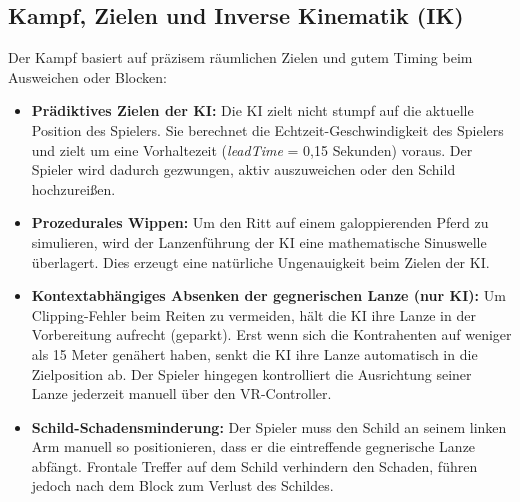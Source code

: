 \documentclass[11pt, a4paper]{article}
\begin{document}
\subsection{Kampf, Zielen und Inverse Kinematik (IK)}
Der Kampf basiert auf präzisem räumlichen Zielen und gutem Timing beim Ausweichen oder Blocken:
\begin{itemize}
    \item \textbf{Prädiktives Zielen der KI:} Die KI zielt nicht stumpf auf die aktuelle Position des Spielers. Sie berechnet die Echtzeit-Geschwindigkeit des Spielers und zielt um eine Vorhaltezeit (\textit{leadTime} = 0,15 Sekunden) voraus. Der Spieler wird dadurch gezwungen, aktiv auszuweichen oder den Schild hochzureißen.
    \item \textbf{Prozedurales Wippen:} Um den Ritt auf einem galoppierenden Pferd zu simulieren, wird der Lanzenführung der KI eine mathematische Sinuswelle überlagert. Dies erzeugt eine natürliche Ungenauigkeit beim Zielen der KI.
    \item \textbf{Kontextabhängiges Absenken der gegnerischen Lanze (nur KI):} Um Clipping-Fehler beim Reiten zu vermeiden, hält die KI ihre Lanze in der Vorbereitung aufrecht (geparkt). Erst wenn sich die Kontrahenten auf weniger als 15 Meter genähert haben, senkt die KI ihre Lanze automatisch in die Zielposition ab. Der Spieler hingegen kontrolliert die Ausrichtung seiner Lanze jederzeit manuell über den VR-Controller.
    \item \textbf{Schild-Schadensminderung:} Der Spieler muss den Schild an seinem linken Arm manuell so positionieren, dass er die eintreffende gegnerische Lanze abfängt. Frontale Treffer auf dem Schild verhindern den Schaden, führen jedoch nach dem Block zum Verlust des Schildes.
\end{itemize}
\end{document}
